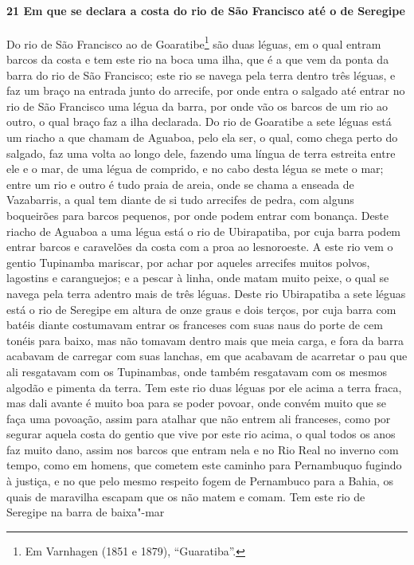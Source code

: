 \begin{linenumbers}
\paragraph{21 Em que se declara a costa do rio de São Francisco até o de Seregipe} \quad
Do rio de São Francisco ao de Goaratibe\footnote{ Em Varnhagen (1851 e 1879),
``Guaratiba''.} são duas léguas, em o qual entram barcos da costa e tem este rio na boca
uma ilha, que é a que vem da ponta da barra do rio de São Francisco; este rio se navega
pela terra dentro três léguas, e faz um braço na entrada junto do arrecife, por onde entra
o salgado até entrar no rio de São Francisco uma légua da barra, por onde vão os barcos de
um rio ao outro, o qual braço faz a ilha declarada. Do rio de Goaratibe a sete léguas está
um riacho a que chamam de Aguaboa, pelo ela ser, o qual, como chega perto do salgado, faz
uma volta ao longo dele, fazendo uma língua de terra estreita entre ele e o mar, de uma
légua de comprido, e no cabo desta légua se mete o mar; entre um rio e outro é tudo praia
de areia, onde se chama a enseada de Vazabarris, a qual tem diante de si tudo arrecifes de
pedra, com alguns boqueirões para barcos pequenos, por onde podem entrar com bonança.
Deste riacho de Aguaboa a uma légua está o rio de Ubirapatiba, por cuja barra podem entrar
barcos e caravelões da costa com a proa ao lesnoroeste. A este rio vem o gentio Tupinamba
mariscar, por achar por aqueles arrecifes muitos polvos, lagostins e caranguejos; e a
pescar à linha, onde matam muito peixe, o qual se navega pela terra adentro mais de três
léguas. Deste rio Ubirapatiba a sete léguas está o rio de Seregipe em altura de onze graus
e dois terços, por cuja barra com batéis diante costumavam entrar os franceses com suas
naus do porte de cem tonéis para baixo, mas não tomavam dentro mais que meia carga, e fora
da barra acabavam de carregar com suas lanchas, em que acabavam de acarretar o pau que ali
resgatavam com os Tupinambas, onde também resgatavam com os mesmos algodão e pimenta da
terra. Tem este rio duas léguas por ele acima a terra fraca, mas dali avante é muito boa
para se poder povoar, onde convém muito que se faça uma povoação, assim para atalhar que
não entrem ali franceses, como por segurar aquela costa do gentio que vive por este rio
acima, o qual todos os anos faz muito dano, assim nos barcos que entram nela e no Rio Real
no inverno com tempo, como em homens, que cometem este caminho para Pernambuquo fugindo à
justiça, e no que pelo mesmo respeito fogem de Pernambuco para a Bahia, os quais de
maravilha escapam que os não matem e comam. Tem este rio de Seregipe na barra de baixa"-mar

\end{linenumbers}
